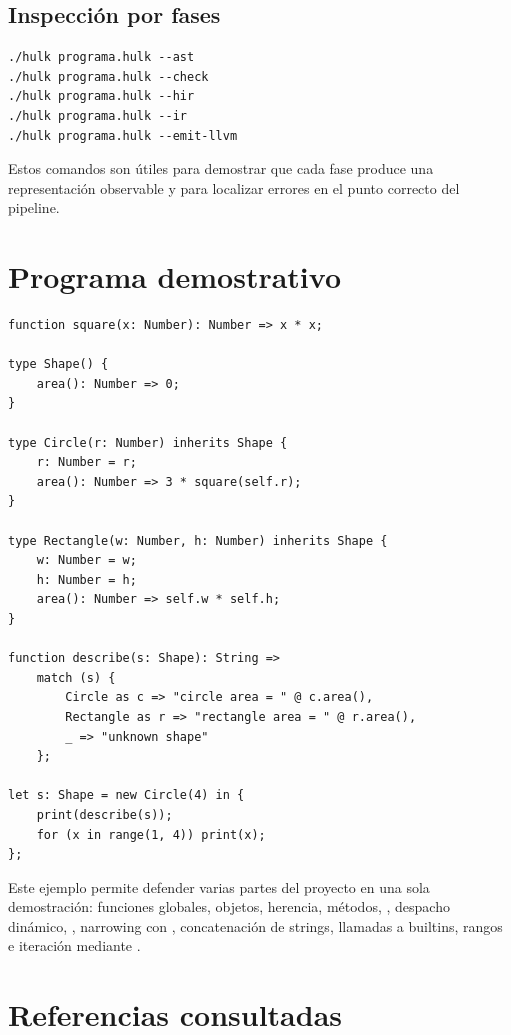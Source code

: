 \documentclass[12pt,letterpaper]{article}
\newcommand{\repo}[1]{\texttt{\detokenize{#1}}}
\begin{document}
\subsection{Inspección por fases}

\begin{lstlisting}[language=IR]
./hulk programa.hulk --ast
./hulk programa.hulk --check
./hulk programa.hulk --hir
./hulk programa.hulk --ir
./hulk programa.hulk --emit-llvm
\end{lstlisting}

Estos comandos son útiles para demostrar que cada fase produce una representación observable y para localizar errores en el punto correcto del pipeline.

\section{Programa demostrativo}

\begin{lstlisting}[language=HULK,caption={Programa sugerido para demostrar mecanismos principales}]
function square(x: Number): Number => x * x;

type Shape() {
    area(): Number => 0;
}

type Circle(r: Number) inherits Shape {
    r: Number = r;
    area(): Number => 3 * square(self.r);
}

type Rectangle(w: Number, h: Number) inherits Shape {
    w: Number = w;
    h: Number = h;
    area(): Number => self.w * self.h;
}

function describe(s: Shape): String =>
    match (s) {
        Circle as c => "circle area = " @ c.area(),
        Rectangle as r => "rectangle area = " @ r.area(),
        _ => "unknown shape"
    };

let s: Shape = new Circle(4) in {
    print(describe(s));
    for (x in range(1, 4)) print(x);
};
\end{lstlisting}

Este ejemplo permite defender varias partes del proyecto en una sola demostración: funciones globales, objetos, herencia, métodos, \repo{self}, despacho dinámico, \repo{match}, narrowing con \repo{Circle as c}, concatenación de strings, llamadas a builtins, rangos e iteración mediante \repo{for}.

\section{Referencias consultadas}
\end{document}
